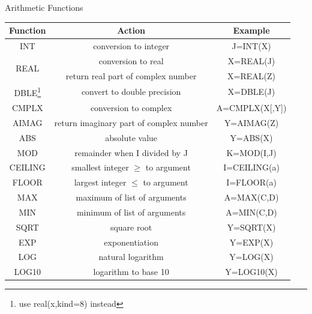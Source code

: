 \documentclass[c,mathserif,compress,xcolor=svgnames]{beamer}
\begin{document}
\begin{frame}{Arithmetic Functions}
  \footnotesize
  \begin{minipage}{\textwidth}
    \begin{center}
      \begin{tabular}{ccc}
        Function & Action & Example \\
        \hline
        INT & conversion to integer & J=INT(X) \\
        \multirow{2}{*}{REAL} & conversion to real & X=REAL(J) \\
        & return real part of complex number & X=REAL(Z) \\
        DBLE\footnote{\tiny use real(x,kind=8) instead} & convert to double precision & X=DBLE(J) \\
        CMPLX & conversion to complex & A=CMPLX(X[,Y]) \\
        AIMAG & return imaginary part of complex number & Y=AIMAG(Z) \\
        ABS & absolute value & Y=ABS(X) \\
        MOD & remainder when I divided by J & K=MOD(I,J) \\
        CEILING & smallest integer $\ge$ to argument & I=CEILING(a) \\
        FLOOR & largest integer $\le$ to argument & I=FLOOR(a) \\
        MAX & maximum of list of arguments & A=MAX(C,D) \\
        MIN & minimum of list of arguments & A=MIN(C,D) \\
        SQRT & square root & Y=SQRT(X) \\
        EXP & exponentiation & Y=EXP(X) \\
        LOG & natural logarithm & Y=LOG(X) \\
        LOG10 & logarithm to base 10 & Y=LOG10(X) \\
        \hline
      \end{tabular}
    \end{center}
  \end{minipage}
\end{frame}
  
\end{document}
